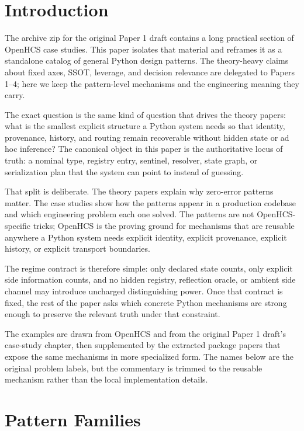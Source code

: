 \section{Introduction}

The archive zip for the original Paper 1 draft contains a long practical section of OpenHCS case studies. This paper isolates that material and reframes it as a standalone catalog of general Python design patterns. The theory-heavy claims about fixed axes, SSOT, leverage, and decision relevance are delegated to Papers 1--4; here we keep the pattern-level mechanisms and the engineering meaning they carry.

The exact question is the same kind of question that drives the theory papers: what is the smallest explicit structure a Python system needs so that identity, provenance, history, and routing remain recoverable without hidden state or ad hoc inference? The canonical object in this paper is the authoritative locus of truth: a nominal type, registry entry, sentinel, resolver, state graph, or serialization plan that the system can point to instead of guessing.

That split is deliberate. The theory papers explain why zero-error patterns matter. The case studies show how the patterns appear in a production codebase and which engineering problem each one solved. The patterns are not OpenHCS-specific tricks; OpenHCS is the proving ground for mechanisms that are reusable anywhere a Python system needs explicit identity, explicit provenance, explicit history, or explicit transport boundaries.

The regime contract is therefore simple: only declared state counts, only explicit side information counts, and no hidden registry, reflection oracle, or ambient side channel may introduce uncharged distinguishing power. Once that contract is fixed, the rest of the paper asks which concrete Python mechanisms are strong enough to preserve the relevant truth under that constraint.

The examples are drawn from OpenHCS and from the original Paper 1 draft's case-study chapter, then supplemented by the extracted package papers that expose the same mechanisms in more specialized form. The names below are the original problem labels, but the commentary is trimmed to the reusable mechanism rather than the local implementation details.

\section{Pattern Families}

